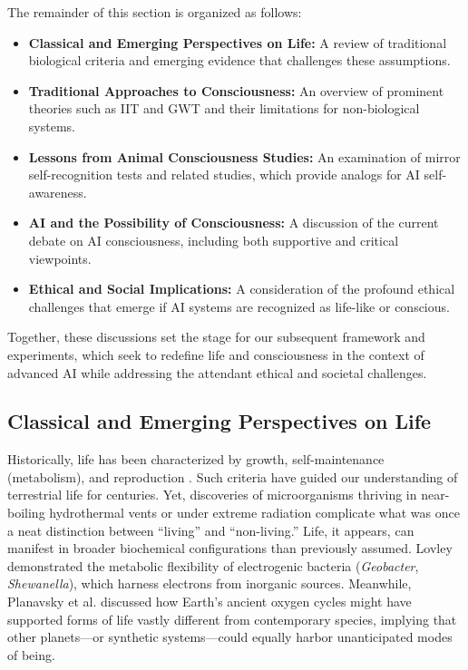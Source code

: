 \documentclass[12pt]{article}
\begin{document}
The remainder of this section is organized as follows:
\begin{itemize}
    \item \textbf{Classical and Emerging Perspectives on Life:} A review of traditional biological criteria and emerging evidence that challenges these assumptions.
    \item \textbf{Traditional Approaches to Consciousness:} An overview of prominent theories such as IIT and GWT and their limitations for non-biological systems.
    \item \textbf{Lessons from Animal Consciousness Studies:} An examination of mirror self-recognition tests and related studies, which provide analogs for AI self-awareness.
    \item \textbf{AI and the Possibility of Consciousness:} A discussion of the current debate on AI consciousness, including both supportive and critical viewpoints.
    \item \textbf{Ethical and Social Implications:} A consideration of the profound ethical challenges that emerge if AI systems are recognized as life-like or conscious.
\end{itemize}

Together, these discussions set the stage for our subsequent framework and experiments, which seek to redefine life and consciousness in the context of advanced AI while addressing the attendant ethical and societal challenges.

\subsection*{Classical and Emerging Perspectives on Life}

Historically, life has been characterized by growth, self-maintenance (metabolism), and reproduction \cite{Kasting1997}. Such criteria have guided our understanding of terrestrial life for centuries. Yet, discoveries of microorganisms thriving in near-boiling hydrothermal vents or under extreme radiation \cite{Rothschild2001} complicate what was once a neat distinction between “living” and “non-living.” Life, it appears, can manifest in broader biochemical configurations than previously assumed. Lovley \cite{Lovley2003} demonstrated the metabolic flexibility of electrogenic bacteria (\textit{Geobacter}, \textit{Shewanella}), which harness electrons from inorganic sources. Meanwhile, Planavsky et al. \cite{Planavsky2014} discussed how Earth’s ancient oxygen cycles might have supported forms of life vastly different from contemporary species, implying that other planets—or synthetic systems—could equally harbor unanticipated modes of being.
\end{document}
